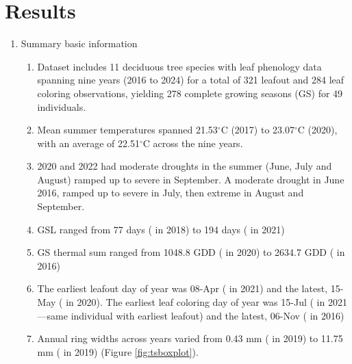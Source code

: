 \documentclass{article}\usepackage[]{graphicx}\usepackage[]{xcolor}
\begin{document}
\clearpage
\section*{Results}

\begin{enumerate}
\item Summary basic information
  \begin{enumerate}

  \item Dataset includes 11 deciduous tree species with leaf phenology data spanning nine years (2016 to 2024) for a total of 
  321 leafout and 
  284 leaf coloring
   observations, yielding 
  278 complete growing seasons (GS) for 
  49 individuals. 
  
  \item Mean summer temperatures spanned 
  21.53$^\circ$C 
  (2017) to 
  23.07$^\circ$C 
  (2020), with an average of
  22.51$^\circ$C across the nine years.

  \item 2020 and 2022 had moderate droughts in the summer (June, July and August) ramped up to severe in September. A moderate drought in June 2016, ramped up to severe in July, then extreme in August and September. 
  
  \item GSL ranged from 
  77 days ({\Afla} in 
  2018) to 
  194 days ({\Asac} in 
  2021)

  \item GS thermal sum ranged from 
  1048.8 GDD ({\Afla} in 
  2020) to 
  2634.7 GDD ({\Tame} in 
  2016)
  
  \item The earliest leafout day of year was 
  08-Apr ({\Afla} in 
  2021) and the latest, 
  15-May ({\Cova} in 
  2020). The earliest leaf coloring day of year was
  15-Jul ({\Afla} in 
  2021---same individual with earliest leafout) and the latest, 
  06-Nov ({\Tame} in
  2016) 
  
  \item Annual ring widths across years varied from 
  0.43 mm ({\Asac} in 2019) to 
  11.75 mm ({\Tame} in 2019) (Figure \ref{fig:tsboxplot}).
 

\end{enumerate}
\end{enumerate}
\end{document}
